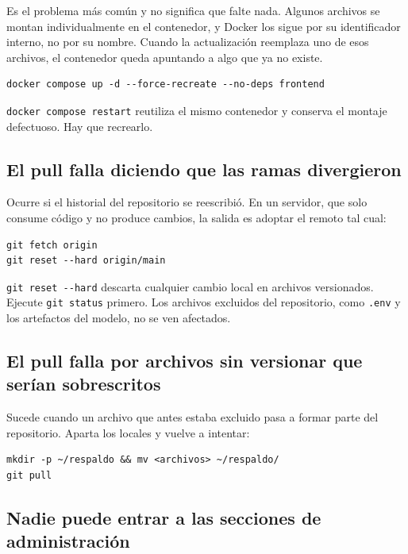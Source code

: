 Es el problema más común y no significa que falte nada. Algunos archivos se
montan individualmente en el contenedor, y Docker los sigue por su identificador
interno, no por su nombre. Cuando la actualización reemplaza uno de esos
archivos, el contenedor queda apuntando a algo que ya no existe.

\begin{verbatim}
docker compose up -d --force-recreate --no-deps frontend
\end{verbatim}

\begin{nota}
\texttt{docker compose restart} reutiliza el mismo contenedor y conserva el
montaje defectuoso. Hay que recrearlo.
\end{nota}

\subsection*{El pull falla diciendo que las ramas divergieron}

Ocurre si el historial del repositorio se reescribió. En un servidor, que solo
consume código y no produce cambios, la salida es adoptar el remoto tal cual:

\begin{verbatim}
git fetch origin
git reset --hard origin/main
\end{verbatim}

\begin{aviso}
\texttt{git reset -{}-hard} descarta cualquier cambio local en archivos
versionados. Ejecute \texttt{git status} primero. Los archivos excluidos del
repositorio, como \texttt{.env} y los artefactos del modelo, no se ven
afectados.
\end{aviso}

\subsection*{El pull falla por archivos sin versionar que serían sobrescritos}

Sucede cuando un archivo que antes estaba excluido pasa a formar parte del
repositorio. Aparta los locales y vuelve a intentar:

\begin{verbatim}
mkdir -p ~/respaldo && mv <archivos> ~/respaldo/
git pull
\end{verbatim}

\subsection*{Nadie puede entrar a las secciones de administración}

